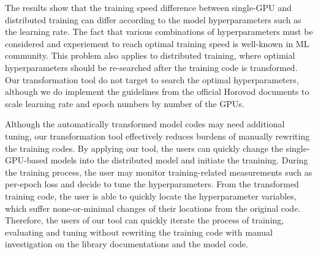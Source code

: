 The results show that the training speed difference between single-GPU and
distributed training can differ according to the model hyperparameters
such as the learning rate. The fact that various combinations of hyperparameters
must be considered and experiement to reach optimal training speed is 
well-known in ML community. This problem also applies to distributed training,
where optimial hyperparameters should be re-searched after the training
code is transformed. Our transformation tool do not target to search the 
optimal hyperparameters, although we do implement the guidelines from the
official Horovod documents to scale learning rate and epoch numbers
by number of the GPUs.  

Although the automatically transformed model codes may need additional
tuning, our transformation tool effectively reduces
burdens of manually rewriting the training codes.
By applying our tool, the users can quickly change the single-GPU-based
models into the distributed model and initiate the tranining.
During the training process, the user may monitor training-related measurements
such as per-epoch loss and decide to tune the hyperparameters.
From the transformed training code, the user is able to quickly locate the
hyperparameter variables, which suffer none-or-minimal changes of their locations
from the original code.
Therefore, the users of our tool can quickly iterate the process of
training, evaluating and tuning without rewriting the
training code with manual investigation on the library documentations and
the model code.

